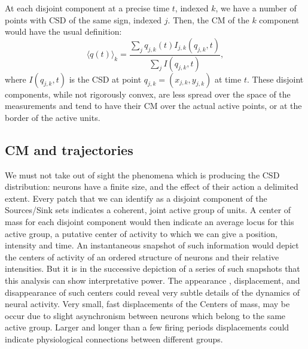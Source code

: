\documentclass{article}
\begin{document}
At each disjoint component at a precise time $t$, indexed $k$, we have a number of points with CSD of the same sign, indexed $j$. Then, the CM of the $k$ component would have the usual definition:
\begin{equation}\label{cmparadisj}
   \langle q(t) \rangle_k =\frac{\sum_j q_{j,k} (t) I_{j,k} (q_{j,k},t)}
           {\sum_j I(q_{j,k},t)},
\end{equation}
where $I(q_{j,k},t)$ is the CSD at point $q_{j,k}=(x_{j,k}, y_{j,k})$ at time $t$. These disjoint components, while not rigorously convex, are less spread over the space of the measurements and tend to have their CM over the actual active points, or at the border of the active units. 

\subsection{CM and trajectories}

We must not take out of sight the phenomena which is producing the CSD distribution: neurons have a finite size, and the effect of their action a delimited extent. Every patch that we can identify as a disjoint component of the Sources/Sink sets indicates a coherent, joint active group of units. A center of mass for each disjoint component would then indicate an average locus for this active group, a putative center of activity to which we can give a position, intensity and time. An instantaneous snapshot of such information would depict the centers of activity of an ordered structure of neurons and their relative intensities. But it is in the successive depiction of a series of such snapshots that this analysis can show interpretative power. The appearance , displacement, and disappearance of such centers could reveal very subtle details of the dynamics of neural activity. Very small, fast displacements of the Centers of mass, may be occur due to slight asynchronism between neurons which belong to the same active group. Larger and  longer than a few firing periods displacements could indicate physiological connections between different groups.
\end{document}
